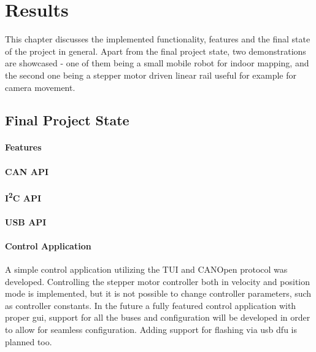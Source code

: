 \chapter{Results}
\label{ch:results}
This chapter discusses the implemented functionality, features and the final state of the project in general.
Apart from the final project state, two demonstrations are showcased - one of them being a small mobile robot for indoor mapping, and the second one being a stepper motor driven linear rail useful for example for camera movement.

\section{Final Project State}
\label{sec:final_project_state}


\subsubsection{Features}

\subsubsection{CAN API}
\subsubsection{I\textsuperscript{2}C API}
\subsubsection{USB API}
\subsubsection{Control Application}
A simple control application utilizing the \acs{TUI} and CANOpen protocol was developed.
Controlling the stepper motor controller both in velocity and position mode is implemented, but it is not possible to change controller parameters, such as controller constants.
In the future a fully featured control application with proper \acs{gui}, support for all the buses and configuration will be developed in order to allow for seamless configuration.
Adding support for flashing via \acs{usb} \acs{dfu} is planned too.

